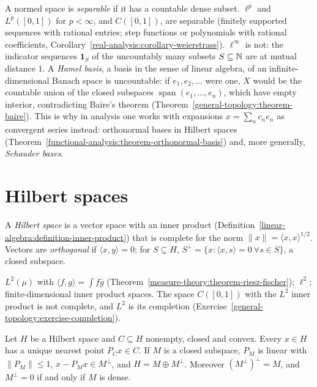 \begin{remark}\label{functional-analysis:remark-separable-bases}
A normed space is \emph{separable} if it has a countable dense subset. $\ell^p$ and $L^p([0, 1])$ for $p < \infty$, and $C([0, 1])$, are separable (finitely supported sequences with rational entries;
step functions or polynomials with rational coefficients, Corollary~\ref{real-analysis:corollary-weierstrass}). $\ell^\infty$ is not: the indicator sequences $\mathbf{1}_S$ of the uncountably many
subsets $S \subseteq \mathbb{N}$ are at mutual distance $1$. A \emph{Hamel basis}, a basis in the sense of linear algebra, of an infinite-dimensional Banach space is uncountable: if $e_1, e_2, \ldots$ were one,
$X$ would be the countable union of the closed subspaces $\operatorname{span}(e_1, \ldots, e_n)$, which have empty interior, contradicting Baire's theorem
(Theorem~\ref{general-topology:theorem-baire}). This is why in analysis one works with expansions $x = \sum_n c_ne_n$ as convergent series instead: orthonormal bases in Hilbert spaces
(Theorem~\ref{functional-analysis:theorem-orthonormal-basis}) and, more generally, \emph{Schauder bases}.
\end{remark}

\section{Hilbert spaces}\label{functional-analysis:section-hilbert}

\begin{definition}\label{functional-analysis:definition-hilbert}
A \emph{Hilbert space} is a vector space with an inner product (Definition~\ref{linear-algebra:definition-inner-product}) that is complete for the norm $\|x\| = \langle x, x \rangle^{1/2}$. Vectors are
\emph{orthogonal} if $\langle x, y \rangle = 0$; for $S \subseteq H$, $S^\perp = \{x : \langle x, s \rangle = 0 \ \forall s \in S\}$, a closed subspace.
\end{definition}

\begin{example}\label{functional-analysis:example-hilbert}
$L^2(\mu)$ with $\langle f, g \rangle = \int f\bar g$ (Theorem~\ref{measure-theory:theorem-riesz-fischer}); $\ell^2$; finite-dimensional inner product spaces. The space $C([0,1])$ with the $L^2$ inner product is
not complete, and $L^2$ is its completion (Exercise~\ref{general-topology:exercise-completion}).
\end{example}

\begin{theorem}\label{functional-analysis:theorem-projection}
Let $H$ be a Hilbert space and $C \subseteq H$ nonempty, closed and convex. Every $x \in H$ has a unique nearest point $P_Cx \in C$. If $M$ is a closed subspace, $P_M$ is linear with $\|P_M\| \leq 1$,
$x - P_Mx \in M^\perp$, and $H = M \oplus M^\perp$. Moreover $(M^\perp)^\perp = M$, and $M^\perp = 0$ if and only if $M$ is dense.
\end{theorem}

